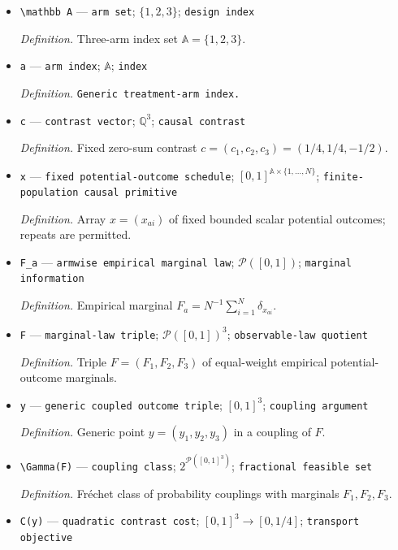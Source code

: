 \documentclass{article}
\begin{document}
\begin{itemize}
  \item \texttt{\textbackslash{}\allowbreak{}mathbb A} --- \texttt{arm set}; \(\{1,2,3\}\); \texttt{design index}
  \par\smallskip\noindent\emph{Definition.} Three-arm index set \(\mathbb A=\{1,2,3\}\).
  \item \texttt{a} --- \texttt{arm index}; \(\mathbb A\); \texttt{index}
  \par\smallskip\noindent\emph{Definition.} \texttt{Generic treatment-\allowbreak{}arm index.}
  \item \texttt{c} --- \texttt{contrast vector}; \(\mathbb Q^3\); \texttt{causal contrast}
  \par\smallskip\noindent\emph{Definition.} Fixed zero-sum contrast \(c=(c_1,c_2,c_3)=(1/4,1/4,-1/2)\).
  \item \texttt{x} --- \texttt{fixed potential-\allowbreak{}outcome schedule}; \([0,1]^{\mathbb A\times\{1,\ldots,N\}}\); \texttt{finite-\allowbreak{}population causal primitive}
  \par\smallskip\noindent\emph{Definition.} Array \(x=(x_{ai})\) of fixed bounded scalar potential outcomes; repeats are permitted.
  \item \texttt{F\_\allowbreak{}a} --- \texttt{armwise empirical marginal law}; \(\mathcal P([0,1])\); \texttt{marginal information}
  \par\smallskip\noindent\emph{Definition.} Empirical marginal \(F_a=N^{-1}\sum_{i=1}^N\delta_{x_{ai}}\).
  \item \texttt{F} --- \texttt{marginal-\allowbreak{}law triple}; \(\mathcal P([0,1])^3\); \texttt{observable-\allowbreak{}law quotient}
  \par\smallskip\noindent\emph{Definition.} Triple \(F=(F_1,F_2,F_3)\) of equal-weight empirical potential-outcome marginals.
  \item \texttt{y} --- \texttt{generic coupled outcome triple}; \([0,1]^3\); \texttt{coupling argument}
  \par\smallskip\noindent\emph{Definition.} Generic point \(y=(y_1,y_2,y_3)\) in a coupling of \(F\).
  \item \texttt{\textbackslash{}\allowbreak{}Gamma(F)} --- \texttt{coupling class}; \(2^{\mathcal P([0,1]^3)}\); \texttt{fractional feasible set}
  \par\smallskip\noindent\emph{Definition.} Fr\'{e}chet class of probability couplings with marginals \(F_1,F_2,F_3\).
  \item \texttt{C(y)} --- \texttt{quadratic contrast cost}; \([0,1]^3\to[0,1/4]\); \texttt{transport objective}

\end{itemize}
\end{document}
